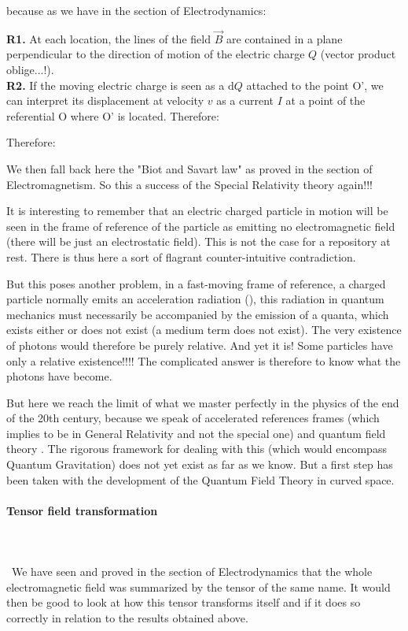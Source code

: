 	because as we have in the section of Electrodynamics: 
	
	\begin{tcolorbox}[title=Remarks,colframe=black,arc=10pt]
	\textbf{R1.} At each location, the lines of the field $\vec{B}$ are contained in a plane perpendicular to the direction of motion of the electric charge $Q$ (vector product oblige...!).\\
	
	\textbf{R2.} If the moving electric charge is seen as a $\mathrm{d}Q$ attached to the point O', we can interpret its displacement at velocity $v$ as a current $I$ at a point of the referential O where O' is located. Therefore:
	
	Therefore:
	
	We then fall back here the "Biot and Savart law" as proved in the section of Electromagnetism. So this a success of the Special Relativity theory again!!!
	\end{tcolorbox}
	It is interesting to remember that an electric charged particle in motion will be seen in the frame of reference of the particle as emitting no electromagnetic field (there will be just an electrostatic field). This is not the case for a repository at rest. There is thus here a sort of flagrant counter-intuitive contradiction.

	But this poses another problem, in a fast-moving frame of reference, a charged particle normally emits an acceleration radiation (), this radiation in quantum mechanics must necessarily be accompanied by the emission of a quanta, which exists either or does not exist (a medium term does not exist). The very existence of photons would therefore be purely relative. And yet it is! Some particles have only a relative existence!!!! The complicated answer is therefore to know what the photons have become.

	But here we reach the limit of what we master perfectly in the physics of the end of the 20th century, because we speak of accelerated references frames (which implies to be in General Relativity and not the special one) and quantum field theory . The rigorous framework for dealing with this (which would encompass Quantum Gravitation) does not yet exist as far as we know. But a first step has been taken with the development of the Quantum Field Theory in curved space.
	
	\pagebreak
	\paragraph{Tensor field transformation}\mbox{}\\\\\
	We have seen and proved in the section of Electrodynamics that the whole electromagnetic field was summarized by the tensor of the same name. It would then be good to look at how this tensor transforms itself and if it does so correctly in relation to the results obtained above.

